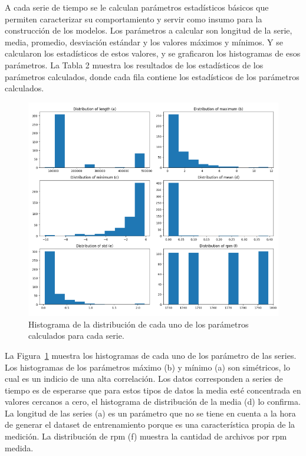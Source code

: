 \documentclass[11pt,a4paper,spanish]{book}
\numberwithin{equation}{chapter}
\numberwithin{figure}{chapter}
\begin{document}
A cada serie de tiempo se le calculan parámetros estadísticos básicos que permiten caracterizar su comportamiento y servir como insumo para la construcción de los modelos. Los parámetros a calcular son longitud de la serie, media, promedio, desviación estándar y los valores máximos y mínimos. Y se calcularon los estadísticos de estos valores, y se graficaron los histogramas de esos parámetros. La Tabla 2 muestra los resultados de los estadísticos de los parámetros calculados, donde cada fila contiene los estadísticos de los parámetros calculados. 


\begin{figure}[h]
    \centering
    \includegraphics[width=1\textwidth]{media/dataset/histogram-01.png}
    \caption{Histograma de la distribución de cada uno de los parámetros calculados para cada serie. }
    \label{fig:figHistogram01}
\end{figure}


La Figura~\ref{fig:figHistogram01} muestra los histogramas de cada uno de los parámetro de las series. Los histogramas de los parámetros máximo (b) y mínimo (a) son simétricos, lo cual es un indicio de una alta correlación. Los datos corresponden a series de tiempo es de esperarse que para estos tipos de datos la media esté concentrada en valores cercanos a cero, el histograma de distribución de la media (d) lo confirma. La longitud de las series (a) es un parámetro que no se tiene en cuenta a la hora de generar el dataset de entrenamiento porque es una característica propia de la medición. La distribución de rpm (f) muestra la cantidad de archivos por rpm medida.    
\end{document}
